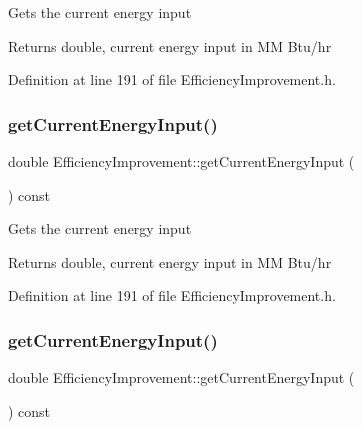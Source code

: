 Gets the current energy input

\begin{DoxyReturn}{Returns}
double, current energy input in MM Btu/hr 
\end{DoxyReturn}


Definition at line 191 of file Efficiency\+Improvement.\+h.

\mbox{\label{class_efficiency_improvement_a8fcbdd3085f0a8b1120fb699522fcc05}} 
\subsubsection{\texorpdfstring{get\+Current\+Energy\+Input()}{getCurrentEnergyInput()}\hspace{0.1cm}{\footnotesize\ttfamily [2/3]}}
{\footnotesize\ttfamily double Efficiency\+Improvement\+::get\+Current\+Energy\+Input (\begin{DoxyParamCaption}{ }\end{DoxyParamCaption}) const\hspace{0.3cm}{\ttfamily [inline]}}

Gets the current energy input

\begin{DoxyReturn}{Returns}
double, current energy input in MM Btu/hr 
\end{DoxyReturn}


Definition at line 191 of file Efficiency\+Improvement.\+h.

\mbox{\label{class_efficiency_improvement_a8fcbdd3085f0a8b1120fb699522fcc05}} 
\subsubsection{\texorpdfstring{get\+Current\+Energy\+Input()}{getCurrentEnergyInput()}\hspace{0.1cm}{\footnotesize\ttfamily [3/3]}}
{\footnotesize\ttfamily double Efficiency\+Improvement\+::get\+Current\+Energy\+Input (\begin{DoxyParamCaption}{ }\end{DoxyParamCaption}) const\hspace{0.3cm}{\ttfamily [inline]}}

